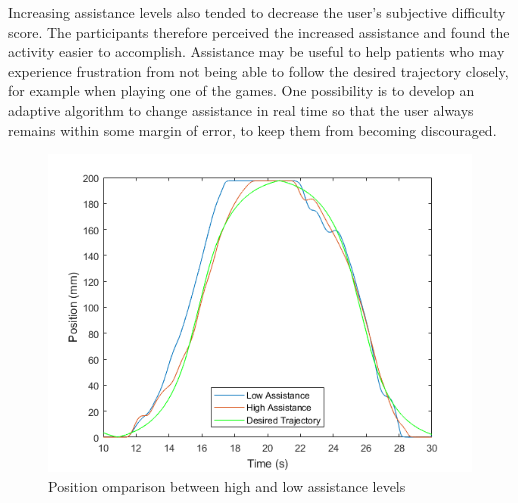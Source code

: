 \documentclass[12pt]{report}
\begin{document}
	Increasing assistance levels also tended to decrease the user's subjective difficulty score. The participants therefore perceived the increased assistance and found the activity easier to accomplish. Assistance may be useful to help patients who may experience frustration from not being able to follow the desired trajectory closely, for example when playing one of the games. One possibility is to develop an adaptive algorithm to change assistance in real time so that the user always remains within some margin of error, to keep them from becoming discouraged. 
 
	
	
	


	


\begin{figure}[h] 
	\centering
	\includegraphics[width=0.9\linewidth]{position_comp}
	\caption{Position omparison between high and low assistance levels}
	\label{fig:pos_comp}
\end{figure}
		
\end{document}

